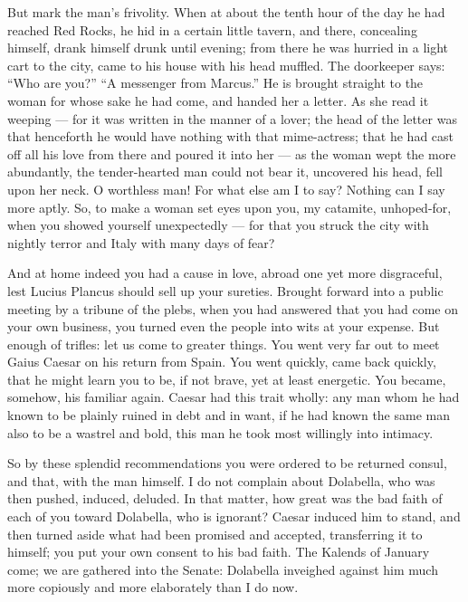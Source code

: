  But mark the man's frivolity. When at about the tenth hour of the day he had reached Red Rocks, he hid in a certain little tavern, and there, concealing himself, drank himself drunk until evening; from there he was hurried in a light cart to the city, came to his house with his head muffled. The doorkeeper says: ``Who are you?'' ``A messenger from Marcus.'' He is brought straight to the woman for whose sake he had come, and handed her a letter. As she read it weeping --- for it was written in the manner of a lover; the head of the letter was that henceforth he would have nothing with that mime-actress; that he had cast off all his love from there and poured it into her --- as the woman wept the more abundantly, the tender-hearted man could not bear it, uncovered his head, fell upon her neck. O worthless man! For what else am I to say? Nothing can I say more aptly. So, to make a woman set eyes upon you, my catamite, unhoped-for, when you showed yourself unexpectedly --- for that you struck the city with nightly terror and Italy with many days of fear?

 And at home indeed you had a cause in love, abroad one yet more disgraceful, lest Lucius Plancus should sell up your sureties. Brought forward into a public meeting by a tribune of the plebs, when you had answered that you had come on your own business, you turned even the people into wits at your expense. But enough of trifles: let us come to greater things. You went very far out to meet Gaius Caesar on his return from Spain. You went quickly, came back quickly, that he might learn you to be, if not brave, yet at least energetic. You became, somehow, his familiar again. Caesar had this trait wholly: any man whom he had known to be plainly ruined in debt and in want, if he had known the same man also to be a wastrel and bold, this man he took most willingly into intimacy.

 So by these splendid recommendations you were ordered to be returned consul, and that, with the man himself. I do not complain about Dolabella, who was then pushed, induced, deluded. In that matter, how great was the bad faith of each of you toward Dolabella, who is ignorant? Caesar induced him to stand, and then turned aside what had been promised and accepted, transferring it to himself; you put your own consent to his bad faith. The Kalends of January come; we are gathered into the Senate: Dolabella inveighed against him much more copiously and more elaborately than I do now.

